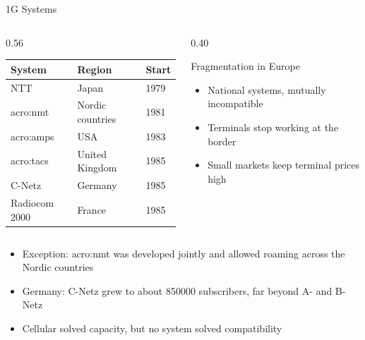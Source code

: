 \begin{frame}{1G Systems}
  \begin{columns}[T,onlytextwidth]
    \begin{column}{0.56\textwidth}
      \centering
      \begin{tabular}{lll}
        \toprule
        \textbf{System} & \textbf{Region} & \textbf{Start} \\
        \midrule
        NTT & Japan & 1979 \\
        \acrshort{acro:nmt} & Nordic countries & 1981 \\
        \acrshort{acro:amps} & USA & 1983 \\
        \acrshort{acro:tacs} & United Kingdom & 1985 \\
        C-Netz & Germany & 1985 \\
        Radiocom 2000 & France & 1985 \\
        \bottomrule
      \end{tabular}
    \end{column}
    \begin{column}{0.40\textwidth}
      \begin{block}{Fragmentation in Europe}
        \begin{itemize}
          \item National systems, mutually incompatible
          \item Terminals stop working at the border
          \item Small markets keep terminal prices high
        \end{itemize}
      \end{block}
    \end{column}
  \end{columns}
  \vspace{1em}
  \begin{itemize}
    \item Exception: \gls{acro:nmt} was developed jointly and allowed roaming across the Nordic countries
    \item Germany: C-Netz grew to about \num{850000} subscribers, far beyond A- and B-Netz
    \item Cellular solved capacity, but no system solved compatibility
  \end{itemize}
\end{frame}

